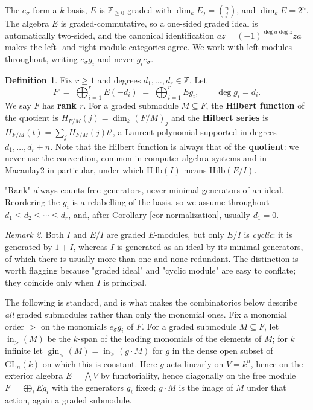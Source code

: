\documentclass[11pt, a4paper, abstract=yes]{scrartcl}
\theoremstyle{definition}
\newtheorem{definition}{Definition}
\theoremstyle{remark}
\newtheorem{remark}[definition]{Remark}
\theoremstyle{plain}
\newcommand{\inn}{\operatorname{in}}
\newcommand{\gin}{\operatorname{gin}}
\begin{document}
The \(e_\sigma\) form a \(k\)-basis, \(E\) is \(\mathbb Z_{\ge0}\)-graded with
\(\dim_kE_j=\binom nj\), and \(\dim_kE=2^n\). The algebra \(E\) is graded-commutative, so a one-sided graded ideal
is automatically two-sided, and the canonical identification \(az=(-1)^{\deg a\deg z}za\) makes the
left- and right-module categories agree. We work with left modules throughout, writing
\(e_\sigma g_i\) and never \(g_ie_\sigma\).

\begin{definition}
Fix \(r\ge1\) and degrees \(d_1,\dots,d_r\in\mathbb Z\). Let
\begin{equation}\label{eq:free-module}
  F \;=\; \bigoplus_{i=1}^{r}E(-d_i) \;=\; \bigoplus_{i=1}^{r}Eg_i,\qquad \deg g_i=d_i.
\end{equation}
We say \(F\) has \textbf{rank \(r\)}. For a graded submodule \(M\subseteq F\), the \textbf{Hilbert function} of the
quotient is \(H_{F/M}(j)=\dim_k(F/M)_j\) and the \textbf{Hilbert series} is
\(H_{F/M}(t)=\sum_jH_{F/M}(j)t^j\), a Laurent polynomial supported in degrees \(d_1,\dots,d_r+n\).
Note that the Hilbert function is always that of the \textbf{quotient}: we never use the convention, common
in computer-algebra systems and in Macaulay2 in particular, under which \(\mathrm{Hilb}(I)\) means
\(\mathrm{Hilb}(E/I)\).
\label{def-free-module}
\end{definition}

"Rank" always counts free generators, never minimal generators of an ideal. Reordering the \(g_i\) is
a relabelling of the basis, so we assume throughout \(d_1\le d_2\le\cdots\le d_r\), and, after
Corollary \ref{cor-normalization}, usually \(d_1=0\).

\begin{remark}
Both \(I\) and \(E/I\) are graded \(E\)-modules, but only \(E/I\) is \emph{cyclic}: it is generated by
\(1+I\), whereas \(I\) is generated as an ideal by its minimal generators, of which there is usually
more than one and none redundant. The distinction is worth flagging because "graded ideal" and
"cyclic module" are easy to conflate; they coincide only when \(I\) is principal.
\label{rem-cyclic}
\end{remark}

The following is standard, and is what makes the combinatorics below describe \emph{all} graded
submodules rather than only the monomial ones. Fix a monomial order \(>\) on the monomials
\(e_\sigma g_i\) of \(F\). For a graded submodule \(M\subseteq F\), let \(\inn_>(M)\) be the
\(k\)-span of the leading monomials of the elements of \(M\); for \(k\) infinite let
\(\gin_>(M)=\inn_>(g\cdot M)\) for \(g\) in the dense open subset of \(\mathrm{GL}_n(k)\) on which
this is constant. Here \(g\) acts linearly on \(V=k^n\), hence on the exterior algebra
\(E=\bigwedge V\) by functoriality, hence diagonally on the free module \(F=\bigoplus_iEg_i\) with
the generators \(g_i\) fixed; \(g\cdot M\) is the image of \(M\) under that action, again a graded
submodule.
\end{document}
